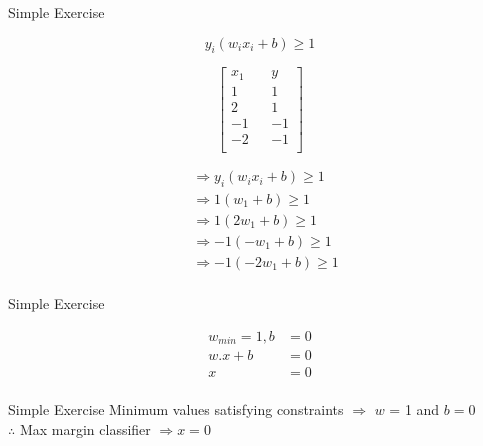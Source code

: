\documentclass{beamer}
\begin{document}
\begin{frame}{Simple Exercise}
\begin{tcolorbox}

\begin{equation*}
y_{i}(w_{i}x_{i} + b) \geq 1
\end{equation*}
\end{tcolorbox}
\begin{multicols}{2}
\begin{equation*}
\begin{bmatrix}
x_{1} && y \\
1 && 1\\
2 && 1\\
-1 && -1\\
-2 && -1\\
\end{bmatrix}
\end{equation*}\break

\begin{align*}
&\Rightarrow y_{i}(w_{i}x_{i} + b) \geq 1\\
&\Rightarrow 1(w_{1} + b) \geq 1\\
&\Rightarrow 1(2w_{1} + b)\geq 1\\
&\Rightarrow -1(-w_{1}+b) \geq 1\\
&\Rightarrow -1(-2w_{1}+b) \geq 1\\
\end{align*}


\end{multicols}
\end{frame}

{
	
}


\begin{frame}{Simple Exercise}

\begin{align*}
w_{min} = 1, b&= 0\\
w.x + b &= 0\\
x &=0 \\
\end{align*}

\end{frame}

\begin{frame}{Simple Exercise}
Minimum values satisfying constraints  $\Rightarrow$
$w$ = 1 and $b = 0$\\
$\therefore$ Max margin classifier $ \Rightarrow x = 0$

\end{frame}
\end{document}
